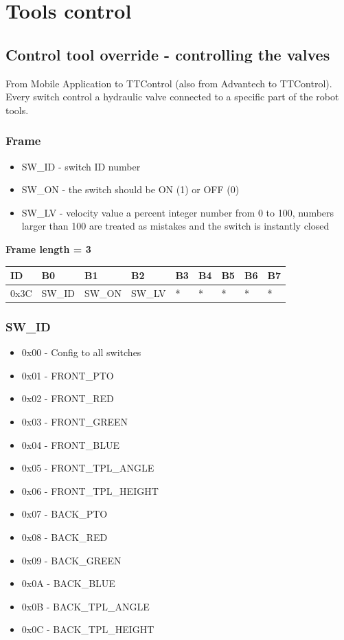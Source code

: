 \documentclass{article}
\begin{document}
\newpage
\section{Tools control}

\subsection{Control tool override - controlling the valves}
From Mobile Application to TTControl (also from Advantech to TTControl). Every switch control a hydraulic valve connected to a specific part of the robot tools.
\subsubsection{Frame}
\begin{itemize}
    \item SW\_ID - switch ID number
    \item SW\_ON - the switch should be ON (1) or OFF (0)
    \item SW\_LV - velocity value a percent integer number from 0 to 100, numbers larger than 100 are treated as mistakes and the switch is instantly closed
\end{itemize}{}

\textbf{Frame length = 3}
\begin{center}
    \begin{tabular}{| p{20pt} | p{40pt} | p{40pt} | p{40pt} | p{40pt} | p{40pt} | p{40pt} | p{40pt} | p{40pt} |}
        \hline
        ID   & B0     & B1     & B2     & B3 & B4 & B5 & B6 & B7 \\
        \hline
        0x3C & SW\_ID & SW\_ON & SW\_LV & *  & *  & *  & *  & *  \\
        \hline
    \end{tabular}
\end{center}

\subsubsection{SW\_ID} \label{sw_id}
\begin{itemize}
    \item 0x00 - Config to all switches
    \item 0x01 - FRONT\_PTO
    \item 0x02 - FRONT\_RED
    \item 0x03 - FRONT\_GREEN
    \item 0x04 - FRONT\_BLUE
    \item 0x05 - FRONT\_TPL\_ANGLE
    \item 0x06 - FRONT\_TPL\_HEIGHT
    \item 0x07 - BACK\_PTO
    \item 0x08 - BACK\_RED
    \item 0x09 - BACK\_GREEN
    \item 0x0A - BACK\_BLUE
    \item 0x0B - BACK\_TPL\_ANGLE
    \item 0x0C - BACK\_TPL\_HEIGHT
\end{itemize}
\end{document}
